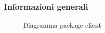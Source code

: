 


\subsection{}
\label{\nogloxy{swedesigner::client}}
\subsubsection{Informazioni generali}
\begin{figure}[H]
	\caption{Diagramma package client}
\end{figure}
